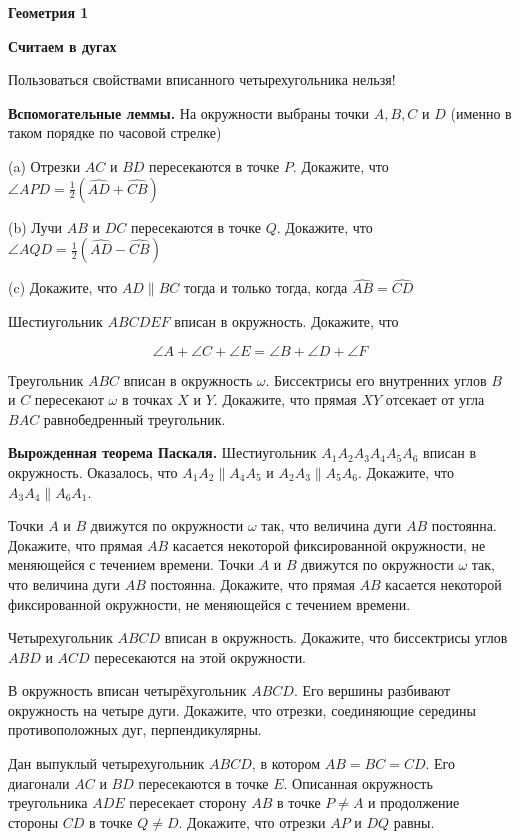 \centerline{\bf \Huge Геометрия 1}
\centerline{\bf \Huge Считаем в дугах}

\begin{flushright}
        \scriptsize{Пользоваться свойствами вписанного четырехугольника нельзя!}
\end{flushright}

 \textbf{Вспомогательные леммы.} На окружности выбраны точки $A, B, C$ и $D$ (именно в таком порядке по часовой стрелке)

(a) Отрезки $A C$ и $B D$ пересекаются в точке $P$. Докажите, что $\angle A P D=\frac{1}{2}(\widehat{A D}+\widehat{C B})$

(b) Лучи $A B$ и $D C$ пересекаются в точке $Q$. Докажите, что $\angle A Q D=\frac{1}{2}(\widehat{A D}-\widehat{C B})$

(c) Докажите, что $A D \| B C$ тогда и только тогда, когда $\widehat{A B}=\widehat{C D}$

 Шестиугольник $A B C D E F$ вписан в окружность. Докажите, что

$$
\angle A+\angle C+\angle E=\angle B+\angle D+\angle F
$$

 Треугольник $A B C$ вписан в окружность $\omega$. Биссектрисы его внутренних углов $B$ и $C$ пересекают $\omega$ в точках $X$ и $Y$. Докажите, что прямая $X Y$ отсекает от угла $B A C$ равнобедренный треугольник.

 \textbf{Вырожденная теорема Паскаля.} Шестиугольник $A_1 A_2 A_3 A_4 A_5 A_6$ вписан в окружность. Оказалось, что $A_1 A_2 \| A_4 A_5$ и $A_2 A_3 \| A_5 A_6$. Докажите, что $A_3 A_4 \| A_6 A_1$.

 Точки $A$ и $B$ движутся по окружности $\omega$ так, что величина дуги $A B$ постоянна. Докажите, что прямая $A B$ касается некоторой фиксированной окружности, не меняющейся с течением времени.
 Точки $A$ и $B$ движутся по окружности $\omega$ так, что величина дуги $A B$ постоянна. Докажите, что прямая $A B$ касается некоторой фиксированной окружности, не меняющейся с течением времени.

 Четырехугольник $A B C D$ вписан в окружность. Докажите, что биссектрисы углов $A B D$ и $A C D$ пересекаются на этой окружности.

 В окружность вписан четырёхугольник $A B C D$. Его вершины разбивают окружность на четыре дуги. Докажите, что отрезки, соединяющие середины противоположных дуг, перпендикулярны.

 Дан выпуклый четырехугольник $A B C D$, в котором $A B=B C=C D$. Его диагонали $A C$ и $B D$ пересекаются в точке $E$. Описанная окружность треугольника $A D E$ пересекает сторону $A B$ в точке $P \neq A$ и продолжение стороны $C D$ в точке $Q \neq D$. Докажите, что отрезки $A P$ и $D Q$ равны.


